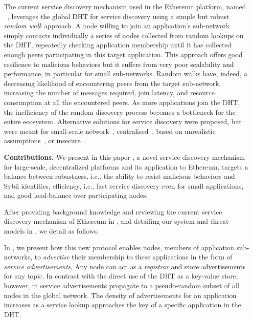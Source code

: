 The current service discovery mechanism used in the Ethereum platform, named \discv~\cite{discv4}, leverages the global DHT for service discovery using a simple but robust \emph{random walk} approach.
A node willing to join an application's sub-network simply contacts individually a series of nodes collected from random lookups on the DHT, repeatedly checking application membership until it has collected enough peers participating in this target application.
This approach offers good resilience to malicious behaviors but it suffers from very poor scalability and performance, in particular for small sub-networks.
Random walks have, indeed, a decreasing likelihood of encountering peers from the target sub-network, increasing the number of messages required, join latency, and resource consumption at all the encountered peers.
As more applications join the DHT, the inefficiency of the random discovery process becomes a bottleneck for the entire ecosystem.
Alternative solutions for service discovery were proposed, but were meant for small-scale network~\cite{zhang2002aggregate, helal2002standards}, centralised~\cite{RFC6763}, based on unrealistic assumptions~\cite{danezis2005sybil, danezis2009sybilinfer}, or insecure~\cite{baldoni2007tera,scribe,poldercast,banno2015,scribe}.

\smallskip
\noindent
\textbf{Contributions.}
%
We present in this paper \sysname, a novel service discovery mechanism for large-scale, decentralized platforms and its application to Ethereum.
\sysname targets a balance between robustness, i.e., the ability to resist malicious behaviors and Sybil identities, efficiency, i.e., fast service discovery even for small applications, and good load-balance over participating nodes.

After providing background knowledge and reviewing the current service discovery mechanism of Ethereum in , and detailing our system and threat models in , we detail \sysname as follows.

In , we present how this new protocol enables nodes, members of application sub-networks, to \emph{advertise} their membership to these applications in the form of \emph{service advertisements}.
Any node can act as a \emph{registrar} and store advertisements for any topic.
In contrast with the direct use of the DHT as a key-value store, however, in \sysname service advertisements propagate to a pseudo-random subset of all nodes in the global network.
The density of advertisements for an application increases as a service lookup approaches the key of a specific application in the DHT.

